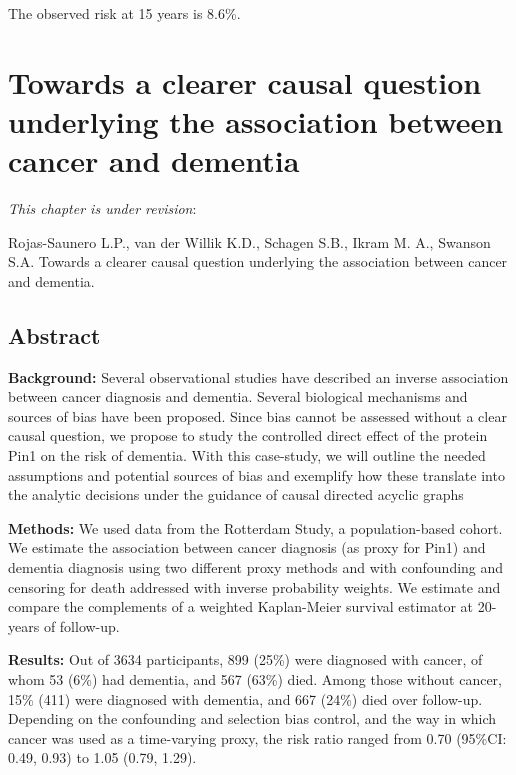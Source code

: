 \documentclass[
]{book}
\begin{document}
The observed risk at 15 years is 8.6\%.

\hypertarget{chapter4}{%
\chapter{Towards a clearer causal question underlying the association between cancer and dementia}\label{chapter4}}


\small

\noindent
\emph{This chapter is under revision}:

Rojas-Saunero L.P., van der Willik K.D., Schagen S.B., Ikram M. A., Swanson S.A. Towards a clearer causal question underlying the association between cancer and dementia.

\newpage
\normalsize

\newpage

\hypertarget{abstract-2}{%
\section{Abstract}\label{abstract-2}}

\textbf{Background:} Several observational studies have described an inverse association between cancer diagnosis and dementia. Several biological mechanisms and sources of bias have been proposed. Since bias cannot be assessed without a clear causal question, we propose to study the controlled direct effect of the protein Pin1 on the risk of dementia. With this case-study, we will outline the needed assumptions and potential sources of bias and exemplify how these translate into the analytic decisions under the guidance of causal directed acyclic graphs

\textbf{Methods:} We used data from the Rotterdam Study, a population-based cohort. We estimate the association between cancer diagnosis (as proxy for Pin1) and dementia diagnosis using two different proxy methods and with confounding and censoring for death addressed with inverse probability weights. We estimate and compare the complements of a weighted Kaplan-Meier survival estimator at 20-years of follow-up.

\textbf{Results:} Out of 3634 participants, 899 (25\%) were diagnosed with cancer, of whom 53 (6\%) had dementia, and 567 (63\%) died. Among those without cancer, 15\% (411) were diagnosed with dementia, and 667 (24\%) died over follow-up. Depending on the confounding and selection bias control, and the way in which cancer was used as a time-varying proxy, the risk ratio ranged from 0.70 (95\%CI: 0.49, 0.93) to 1.05 (0.79, 1.29).
\end{document}

